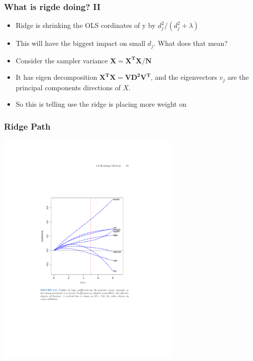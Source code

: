 \begin{frame}
    \frametitle{What is rigde doing? II}
    \begin{itemize}
        \item Ridge is shrinking the OLS cordinates of y by $d_j^2/(d_j^2 + \lambda)$
        \item This will have the biggest impact on small $d_j$. What does that mean? 
        \item Consider the sampler variance $\mathbf{X=X^TX/N}$ 
        \item It has eigen decomposition $\mathbf{X^TX = VD^2V^T}$, and the eigenvectors $v_j$ are the \alert{principal components} directions of $X$. 
        \item So this is telling use the ridge is placing more weight on  
     \end{itemize}
\end{frame} 

\begin{frame}
    \frametitle{Ridge Path}
    \begin{center}
    \includegraphics[width=3.5in]{./resources/ridgepath}
    \end{center}
\end{frame}
    

